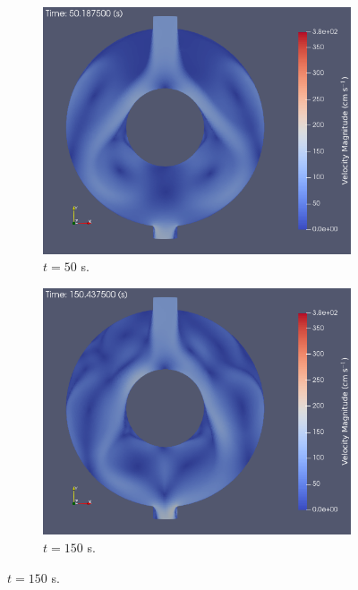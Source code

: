\begin{figure}[H]
    \centering
    \begin{subfigure}[b]{0.495\textwidth}
        \centering
        \includegraphics[width=\textwidth]{images/demos/bwr_shield/vel/vel_50s.png}
        \caption{$t = 50$ s.}
        \label{fig:demo:bwr:vel:50s}
    \end{subfigure}
    \hfill
    \begin{subfigure}[b]{0.495\textwidth}
        \centering
        \includegraphics[width=\textwidth]{images/demos/bwr_shield/vel/vel_150s.png}
        \caption{$t = 150$ s.}
        \label{fig:demo:bwr:vel:150s}

\end{subfigure}
\end{figure}
